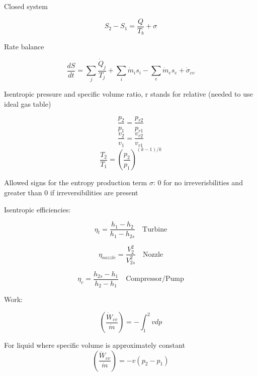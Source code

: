\documentclass[paper=letter, fontsize=11pt]{scrartcl}
\numberwithin{equation}{section}        %
\numberwithin{figure}{section}          %
\numberwithin{table}{section}               %
\begin{document}
Closed system

\begin{equation}
    S_2-S_1 = \frac{Q}{T_b}+\sigma
\end{equation}

Rate balance

\begin{equation}
    \frac{dS}{dt} = \sum_j \frac{\dot Q_j}{T_j} + \sum_i \dot m_i s_i - \sum_e \dot m_e s_e +\dot\sigma_{cv}
\end{equation}

Isentropic pressure and specific volume ratio, r stands for relative (needed to use ideal gas table)

\begin{equation}
    \frac{p_2}{p_1}=\frac{p_{r2}}{p_{r1}}
\end{equation}
\begin{equation}
    \frac{v_2}{v_1}=\frac{v_{r2}}{v_{r1}}
\end{equation}
\begin{equation}
    \frac{T_2}{T_1} = \left(\frac{p_2}{p_1}\right)^{(k-1)/k}
\end{equation}

Allowed signs for the entropy production term $\sigma$: 0 for no irreverisbilities and greater than 0 if irreversibilities are present

Isentropic efficiencies:

\begin{equation}
    \eta_t = \frac{h_1 - h_2}{h_1 - h_{2s}}\quad\text{Turbine}
\end{equation}

\begin{equation}
    \eta_{nozzle} = \frac{V_2^2}{V_{2s}^2}\quad\text{Nozzle}
\end{equation}

\begin{equation}
    \eta_c = \frac{h_{2s} - h_1}{h_2 - h_1}\quad\text{Compressor/Pump}
\end{equation}

Work:

\begin{equation}
    \left(\frac{\dot W_{cv}}{\dot m}\right) = -\int_1^2 vdp
\end{equation}

For liquid where specific volume is approximately constant
\begin{equation}
    \left(\frac{\dot W_{cv}}{\dot m}\right) = -v(p_2-p_1)
\end{equation}
\end{document}
